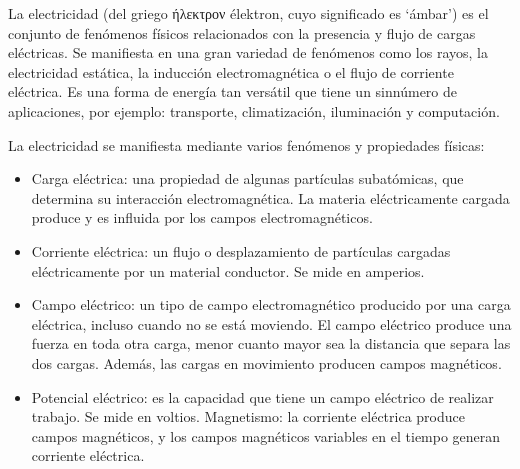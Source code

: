 \documentclass{article}
\begin{document}
La electricidad (del griego ήλεκτρον élektron, cuyo significado es ‘ámbar’) es el conjunto de fenómenos físicos relacionados con la presencia y flujo de cargas eléctricas. Se manifiesta en una gran variedad de fenómenos como los rayos, la electricidad estática, la inducción electromagnética o el flujo de corriente eléctrica. Es una forma de energía tan versátil que tiene un sinnúmero de aplicaciones, por ejemplo: transporte, climatización, iluminación y computación.\citep{Elec}

La electricidad se manifiesta mediante varios fenómenos y propiedades físicas:\citep{Elec}


\begin{itemize}
   

     \item Carga eléctrica: una propiedad de algunas partículas subatómicas, que determina su interacción electromagnética. La materia eléctricamente cargada produce y es influida por los campos electromagnéticos.\citep{Elec}
     
     \item Corriente eléctrica: un flujo o desplazamiento de partículas cargadas eléctricamente por un material conductor. Se mide en amperios.\citep{Elec}
     
     \item Campo eléctrico: un tipo de campo electromagnético producido por una carga eléctrica, incluso cuando no se está moviendo. El campo eléctrico produce una fuerza en toda otra carga, menor cuanto mayor sea la distancia que separa las dos cargas. Además, las cargas en movimiento producen campos magnéticos.\citep{Elec}
     
     \item Potencial eléctrico: es la capacidad que tiene un campo eléctrico de realizar trabajo. Se mide en voltios.
    Magnetismo: la corriente eléctrica produce campos magnéticos, y los campos magnéticos variables en el tiempo generan corriente eléctrica.\citep{Elec}

\end{itemize}


\end{document}
